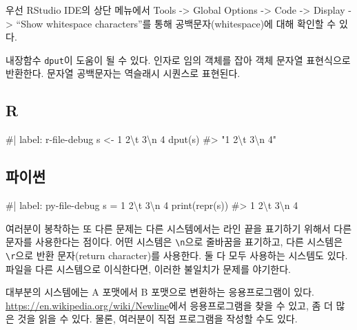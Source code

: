 \documentclass[
  letterpaper,
]{book}
\newenvironment{Shaded}{\begin{snugshade}}{\end{snugshade}}
\newcommand{\NormalTok}[1]{\textcolor[rgb]{0.00,0.23,0.31}{#1}}
\begin{document}
우선 RStudio IDE의 상단 메뉴에서 Tools -\textgreater{} Global Options
-\textgreater{} Code -\textgreater{} Display -\textgreater{} ``Show
whitespace characters''를 통해 공백문자(whitespace)에 대해 확인할 수
있다.

내장함수 \texttt{dput}이 도움이 될 수 있다. 인자로 임의 객체를 잡아 객체
문자열 표현식으로 반환한다. 문자열 공백문자는 역슬래시 시퀀스로
표현된다.   

\subsection{R}

\begin{Shaded}
\begin{Highlighting}[]
\NormalTok{\#| label: r{-}file{-}debug}
\NormalTok{s \textless{}{-} \textquotesingle{}1 2\textbackslash{}t 3\textbackslash{}n 4\textquotesingle{}}
\NormalTok{dput(s)}
\NormalTok{\#\textgreater{} "1 2\textbackslash{}t 3\textbackslash{}n 4"}
\end{Highlighting}
\end{Shaded}

\subsection{파이썬}

\begin{Shaded}
\begin{Highlighting}[]
\NormalTok{\#| label: py{-}file{-}debug}
\NormalTok{s = \textquotesingle{}1 2\textbackslash{}t 3\textbackslash{}n 4\textquotesingle{}}
\NormalTok{print(repr(s))}
\NormalTok{\#\textgreater{} \textquotesingle{}1 2\textbackslash{}t 3\textbackslash{}n 4\textquotesingle{}}
\end{Highlighting}
\end{Shaded}

여러분이 봉착하는 또 다른 문제는 다른 시스템에서는 라인 끝을 표기하기
위해서 다른 문자를 사용한다는 점이다. 어떤 시스템은
\texttt{\textbackslash{}n}으로 줄바꿈을 표기하고, 다른 시스템은
\texttt{\textbackslash{}r}으로 반환 문자(return character)를 사용한다.
둘 다 모두 사용하는 시스템도 있다. 파일을 다른 시스템으로 이식한다면,
이러한 불일치가 문제를 야기한다. 

대부분의 시스템에는 A 포맷에서 B 포맷으로 변환하는 응용프로그램이 있다.
\url{https://en.wikipedia.org/wiki/Newline}에서 응용프로그램을 찾을 수
있고, 좀 더 많은 것을 읽을 수 있다. 물론, 여러분이 직접 프로그램을
작성할 수도 있다.
\end{document}
